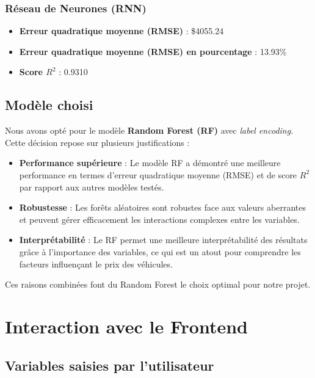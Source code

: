 \documentclass[12pt]{report}
\begin{document}
\subsubsection{Réseau de Neurones (RNN)}

\begin{itemize}
    \item \textbf{Erreur quadratique moyenne (RMSE)} : \$4055.24
    \item \textbf{Erreur quadratique moyenne (RMSE) en pourcentage} : 13.93\%
    \item \textbf{Score \( R^2 \)} : 0.9310
\end{itemize}

\subsection{Modèle choisi}

Nous avons opté pour le modèle \textbf{Random Forest (RF)} avec \textit{label encoding}. Cette décision repose sur plusieurs justifications :

\begin{itemize}
    \item \textbf{Performance supérieure} : Le modèle RF a démontré une meilleure performance en termes d'erreur quadratique moyenne (RMSE) et de score \( R^2 \) par rapport aux autres modèles testés.
    \item \textbf{Robustesse} : Les forêts aléatoires sont robustes face aux valeurs aberrantes et peuvent gérer efficacement les interactions complexes entre les variables.
    \item \textbf{Interprétabilité} : Le RF permet une meilleure interprétabilité des résultats grâce à l'importance des variables, ce qui est un atout pour comprendre les facteurs influençant le prix des véhicules.
\end{itemize}

Ces raisons combinées font du Random Forest le choix optimal pour notre projet.



\section{Interaction avec le Frontend}

\subsection{Variables saisies par l'utilisateur}
\end{document}
